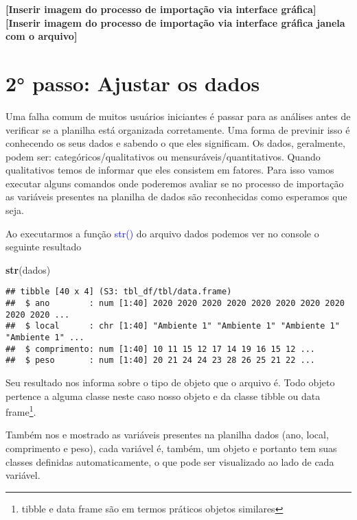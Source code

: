 \documentclass[titlepage, oneside, openany, a4paper]{book}
\newenvironment{Shaded}{\begin{snugshade}}{\end{snugshade}}
\newcommand{\KeywordTok}[1]{\textcolor[rgb]{0.13,0.29,0.53}{\textbf{#1}}}
\newcommand{\NormalTok}[1]{#1}
\begin{document}
\textbf{{[}Inserir imagem do processo de importação via interface gráfica{]}}
\textbf{{[}Inserir imagem do processo de importação via interface gráfica janela com o arquivo{]}}

\hypertarget{passo-ajustar-os-dados}{%
\section{2° passo: Ajustar os dados}\label{passo-ajustar-os-dados}}

Uma falha comum de muitos usuários iniciantes é passar para as análises antes de verificar se a planilha está organizada corretamente. Uma forma de previnir isso é conhecendo os seus dados e sabendo o que eles significam. Os dados, geralmente, podem ser: categóricos/qualitativos ou mensuráveis/quantitativos. Quando qualitativos temos de informar que eles consistem em fatores. Para isso vamos executar alguns comandos onde poderemos avaliar se no processo de importação as variáveis presentes na planilha de dados são reconhecidas como esperamos que seja.

Ao executarmos a função \textcolor{blue}{str()} do arquivo dados podemos ver no console o seguinte resultado

\begin{Shaded}
\begin{Highlighting}[]
\KeywordTok{str}\NormalTok{(dados)}
\end{Highlighting}
\end{Shaded}

\begin{verbatim}
## tibble [40 x 4] (S3: tbl_df/tbl/data.frame)
##  $ ano        : num [1:40] 2020 2020 2020 2020 2020 2020 2020 2020 2020 2020 ...
##  $ local      : chr [1:40] "Ambiente 1" "Ambiente 1" "Ambiente 1" "Ambiente 1" ...
##  $ comprimento: num [1:40] 10 11 15 12 17 14 19 16 15 12 ...
##  $ peso       : num [1:40] 20 21 24 24 23 28 26 25 21 22 ...
\end{verbatim}

Seu resultado nos informa sobre o tipo de objeto que o arquivo é. Todo objeto pertence a alguma classe neste caso nosso objeto e da classe tibble ou data frame\footnote{tibble e data frame são em termos práticos objetos similares}.

Também nos e mostrado as variáveis presentes na planilha dados (ano, local, comprimento e peso), cada variável é, também, um objeto e portanto tem suas classes definidas automaticamente, o que pode ser visualizado ao lado de cada variável.
\end{document}
